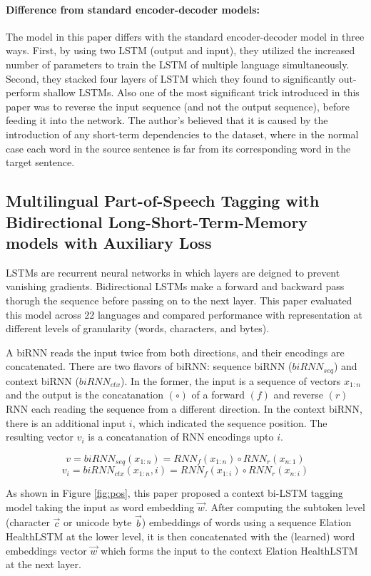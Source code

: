 \documentclass{article}
\begin{document}
	\paragraph{Difference from standard encoder-decoder models: }The model in this paper differs with the standard encoder-decoder model in three ways. First, by using two LSTM (output and input), they utilized the increased number of parameters to train the LSTM of multiple language simultaneously. Second, they stacked four layers of LSTM which they found to significantly out-perform shallow LSTMs. Also one of the most significant trick introduced in this paper was to reverse the input sequence (and not the output sequence), before feeding it into the network. The author's believed that it is caused by the introduction of any short-term dependencies to the dataset, where in the normal case each word in the source sentence is far from its corresponding word in the target sentence.
	
\subsection{Multilingual Part-of-Speech Tagging with Bidirectional Long-Short-Term-Memory models with Auxiliary Loss}
\label{sec:pos}

	LSTMs are recurrent neural networks in which layers are deigned to prevent vanishing gradients. Bidirectional LSTMs make a forward and backward pass thorugh the sequence before passing on to the next layer. This paper evaluated this model across 22 languages and compared performance with representation at different levels of granularity (words, characters, and bytes). 
	
	A biRNN reads the input twice from both directions, and their encodings are concatenated. There are two flavors of biRNN: sequence biRNN (\(biRNN_{seq}\)) and context biRNN (\(biRNN_{ctx}\)). In the former, the input is a sequence of vectors \(x_{1:n}\) and the output is the concatanation \((\circ)\) of a forward \((f)\) and reverse \((r)\) RNN each reading the sequence from a different direction. In the context biRNN, there is an additional input \(i\), which indicated the sequence position. The resulting vector \(v_i\) is a concatanation of RNN encodings upto \(i\). 
	
	\[v = biRNN_{seq} (x_{1:n}) = RNN_f(x_{1:n}) \circ RNN_r(x_{n:1})\]
	\[v_i = biRNN_{ctx} (x_{1:n}, i) = RNN_f(x_{1:i}) \circ RNN_r(x_{n:i})\]
	
	As shown in Figure \ref{fig:pos}, this paper proposed a context bi-LSTM tagging model taking the input as word embedding \(\overrightarrow{w}\). After computing the subtoken level (character \(\overrightarrow{c}\) or unicode byte \(\overrightarrow{b}\)) embeddings of words using a sequence Elation HealthLSTM at the lower level, it is then concatenated with the (learned) word embeddings vector \(\overrightarrow{w}\) which forms the input to the context Elation HealthLSTM at the next layer. 
	
\end{document}
